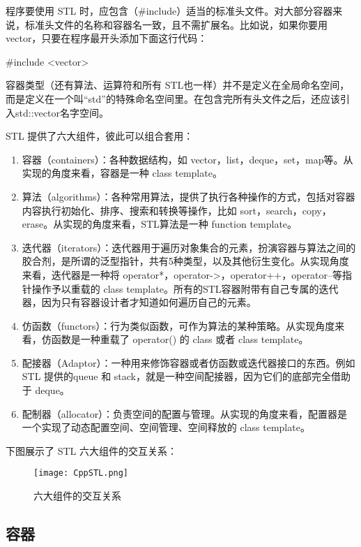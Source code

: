 程序要使用 STL 时，应包含（\#include）适当的标准头文件。对大部分容器来说，标准头文件的名称和容器名一致，且不需扩展名。比如说，如果你要用vector，只要在程序最开头添加下面这行代码：

\begin{Code}
#include <vector>
\end{Code}

容器类型（还有算法、运算符和所有 STL也一样）并不是定义在全局命名空间，而是定义在一个叫“std”的特殊命名空间里。在包含完所有头文件之后，还应该引入std::vector名字空间。

STL 提供了六大组件，彼此可以组合套用：
\begin{enumerate}
	\item  容器（containers）：各种数据结构，如 vector，list，deque，set，map等。从实现的角度来看，容器是一种 class template。
	\item  算法（algorithms）：各种常用算法，提供了执行各种操作的方式，包括对容器内容执行初始化、排序、搜索和转换等操作，比如 sort，search，copy，erase。从实现的角度来看，STL算法是一种 function template。
	\item  迭代器（iterators）：迭代器用于遍历对象集合的元素，扮演容器与算法之间的胶合剂，是所谓的泛型指针，共有5种类型，以及其他衍生变化。从实现角度来看，迭代器是一种将 operator*，operator->，operator++，operator--等指针操作予以重载的 class template。所有的STL容器附带有自己专属的迭代器，因为只有容器设计者才知道如何遍历自己的元素。
	\item  仿函数（functors）：行为类似函数，可作为算法的某种策略。从实现角度来看，仿函数是一种重载了 operator() 的 class 或者 class template。
	\item  配接器（Adaptor）：一种用来修饰容器或者仿函数或迭代器接口的东西。例如 STL 提供的queue 和 stack，就是一种空间配接器，因为它们的底部完全借助于 deque。
	\item  配制器（allocator）：负责空间的配置与管理。从实现的角度来看，配置器是一个实现了动态配置空间、空间管理、空间释放的 class template。
\end{enumerate}
下图展示了 STL 六大组件的交互关系：

\begin{figure}[H]
	\centering \texttt{[image: CppSTL.png]}
	\caption{六大组件的交互关系}
\end{figure}

\subsection {容器}

